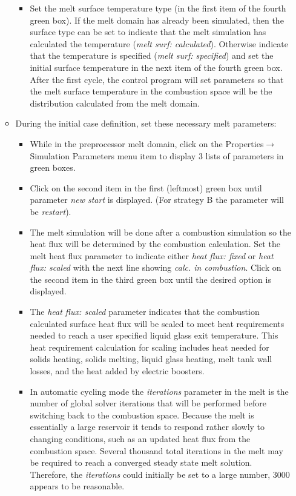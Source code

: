 \documentclass[12pt]{article}
\newcommand{\smenu}[2]{\textsf{#1$\to$#2}}
\newcommand{\parm}[1]{\textit{#1}}
\numberwithin{equation}{section}
\begin{document}
\begin{enumerate}
\begin{itemize}
\begin{itemize}
			\item Set the melt surface temperature type (in the first item of the fourth green box). If the melt domain has already been simulated, then the surface type can be set to indicate that the melt simulation has calculated the temperature (\parm{melt surf: calculated}). Otherwise indicate that the temperature is specified (\parm{melt surf: specified}) and set the initial surface temperature in the next item of the fourth green box. After the first cycle, the control program will set parameters so that the melt surface temperature in the combustion space will be the distribution calculated from the melt domain.
			\end{itemize}
		\item During the initial case definition, set these necessary melt parameters:
		\begin{itemize}
			\item While in the preprocessor melt domain, click on the \smenu{Properties}{Simulation Parameters} menu item to display 3 lists of parameters in green boxes.
			\item Click on the second item in the first (leftmost) green box until parameter \parm{new start} is displayed. (For strategy B the parameter will be \parm{restart}). 
			\item The melt simulation will be done after a combustion simulation so the heat flux will be determined by the combustion calculation. Set the melt heat flux parameter to indicate either \parm{heat flux: fixed} or \parm{heat flux: scaled} with the next line showing \parm{calc. in combustion}. Click on the second item in the third green box until the desired option is displayed.
			\item The \parm{heat flux: scaled} parameter indicates that the combustion calculated surface heat flux will be scaled to meet heat requirements needed to reach a user specified liquid glass exit temperature. This heat requirement calculation for scaling includes heat needed for solids heating, solids melting, liquid glass heating, melt tank wall losses, and the heat added by electric boosters.
			\item In automatic cycling mode the \parm{iterations} parameter in the melt is the number of global solver iterations that will be performed before switching back to the combustion space. Because the melt is essentially a large reservoir it tends to respond rather slowly to changing conditions, such as an updated heat flux from the combustion space. Several thousand total iterations in the melt may be required to reach a converged steady state melt solution. Therefore, the \parm{iterations} could initially be set to a large number, 3000 appears to be reasonable.

\end{itemize}
\end{itemize}
\end{enumerate}
\end{document}
